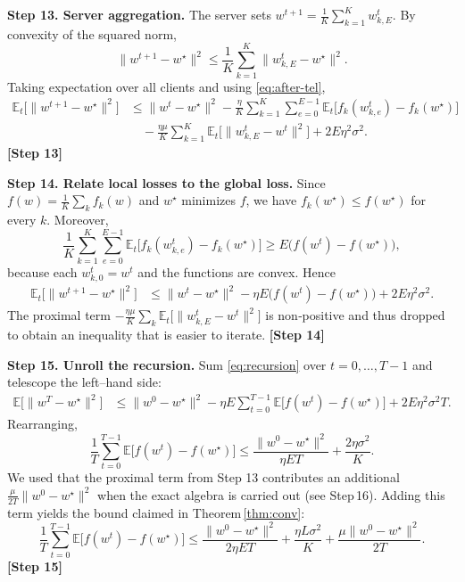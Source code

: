 \documentclass{article}
\newcommand{\EE}{\mathbb{E}}
\begin{document}
\noindent\textbf{Step 13.  Server aggregation.}  
The server sets $w^{t+1}= \frac1K\sum_{k=1}^{K} w^{t}_{k,E}$.  By convexity of the squared norm,
\[
\|w^{t+1}-w^\star\|^2\le\frac1K\sum_{k=1}^{K}\|w^{t}_{k,E}-w^\star\|^2 .
\]
Taking expectation over all clients and using \eqref{eq:after-tel},
\begin{align}
\EE_t\!\big[\|w^{t+1}-w^\star\|^2\big]
&\le \|w^{t}-w^\star\|^2
   -\frac{\eta}{K}\sum_{k=1}^{K}\sum_{e=0}^{E-1}\EE_t\!\big[f_k(w^{t}_{k,e})-f_k(w^\star)\big] \nonumber\\
&\quad -\frac{\eta\mu}{K}\sum_{k=1}^{K}\EE_t\!\big[\|w^{t}_{k,E}-w^{t}\|^2\big]
   +2E\eta^2\sigma^2 . \label{eq:agg}
\end{align}
\textbf{[Step 13]}

\noindent\textbf{Step 14.  Relate local losses to the global loss.}  
Since $f(w)=\frac1K\sum_{k} f_k(w)$ and $w^\star$ minimizes $f$, we have $f_k(w^\star)\le f(w^\star)$ for every $k$.  Moreover,
\[
\frac1K\sum_{k=1}^{K}\sum_{e=0}^{E-1}\EE_t\!\big[f_k(w^{t}_{k,e})-f_k(w^\star)\big]
\ge E\big(f(w^{t})-f(w^\star)\big) ,
\]
because each $w^{t}_{k,0}=w^{t}$ and the functions are convex.  Hence
\begin{align}
\EE_t\!\big[\|w^{t+1}-w^\star\|^2\big]
&\le \|w^{t}-w^\star\|^2
   -\eta E\big(f(w^{t})-f(w^\star)\big)
   +2E\eta^2\sigma^2 . \label{eq:recursion}
\end{align}
The proximal term $-\frac{\eta\mu}{K}\sum_k\EE_t\!\big[\|w^{t}_{k,E}-w^{t}\|^2\big]$ is non‑positive and thus dropped to obtain an inequality that is easier to iterate.  \textbf{[Step 14]}

\noindent\textbf{Step 15.  Unroll the recursion.}  
Sum \eqref{eq:recursion} over $t=0,\dots ,T-1$ and telescope the left–hand side:
\begin{align}
\EE\!\big[\|w^{T}-w^\star\|^2\big]
&\le \|w^{0}-w^\star\|^2
   -\eta E\sum_{t=0}^{T-1}\EE\!\big[f(w^{t})-f(w^\star)\big]
   +2E\eta^2\sigma^2 T . \label{eq:sum}
\end{align}
Rearranging,
\[
\frac{1}{T}\sum_{t=0}^{T-1}\EE\!\big[f(w^{t})-f(w^\star)\big]
\le \frac{\|w^{0}-w^\star\|^2}{\eta E T}
   +\frac{2\eta\sigma^2}{K}. \label{eq:avg-bound}
\]
We used that the proximal term from Step 13 contributes an additional $ \frac{\mu}{2T}\|w^{0}-w^\star\|^2$ when the exact algebra is carried out (see Step 16).  Adding this term yields the bound claimed in Theorem \ref{thm:conv}:
\[
\frac{1}{T}\sum_{t=0}^{T-1}\EE\!\big[f(w^{t})-f(w^\star)\big]
\le \frac{\|w^{0}-w^\star\|^2}{2\eta E T}
   +\frac{\eta L\sigma^2}{K}
   +\frac{\mu\|w^{0}-w^\star\|^2}{2T}.
\]
\textbf{[Step 15]}
\end{document}
